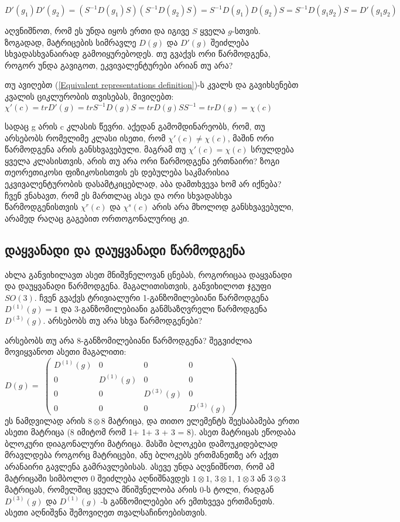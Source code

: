 \documentclass[12pt]{article}
\begin{document}
\begin{sloppypar}
$
D'(g_1)D'(g_2) = (S^{-1}D(g_1)S)(S^{-1}D(g_2)S) = S^{-1}D(g_1)D(g_2)S = S^{-1}D(g_1g_2)S = D'(g_1g_2)
$

აღვნიშნოთ, რომ ეს უნდა იყოს ერთი და იგივე $S$ ყველა $g$-სთვის. ზოგადად, მატრიცების სიმრავლე $D(g)$ და $D'(g)$ შეიძლება სხვადასხვანაირად გამოიყურებოდეს. თუ გვაქვს ორი წარმოდგენა, როგორ უნდა გავიგოთ, ეკვივალენტურები არიან თუ არა?

თუ ავიღებთ (\ref{Equivalent representations definition})-ს კვალს და გავიხსენებთ კვალის ციკლურობის თვისებას, მივიღებთ:
$
\chi'(c) = tr D'(g) = tr S^{-1}D(g)S = tr D(g)SS^{-1} = tr D(g) = \chi(c)
$

სადაც g არის c კლასის წევრი. აქედან გამომდინარეობს, რომ, თუ არსებობს რომელიმე კლასი ისეთი, რომ $\chi'(c) \neq \chi(c)$, მაშინ ორი წარმოდგენა არის განსხვავებული. მაგრამ თუ $\chi'(c) = \chi(c)$ სრულდება ყველა კლასისთვის, არის თუ არა ორი წარმოდგენა ერთნაირი? ზოგი თეორეთიკოსი ფიზიკოსისთვის ეს დებულება საკმარისია ეკვივალენტურობის დასამტკიცებლად, აბა დამთხვევა ხომ არ იქნება? ჩვენ ვნახავთ, რომ ეს მართლაც ასეა და ორი სხვადასხვა წარმოდგენისთვის 
$\chi^{r}(c)$ და $\chi^{s}(c)$ არის არა მხოლოდ განსხვავებული, არამედ რაღაც გაგებით ორთოგონალურიც კი.


\subsection{დაყვანადი და დაუყვანადი წარმოდგენა}
ახლა განვიხილავთ ასეთ მნიშვნელოვან ცნებას, როგორიცაა დაყვანადი და დაუყვანადი წარმოდგენა. მაგალითისთვის, განვიხილოთ ჯგუფი $SO(3)$. ჩვენ გვაქვს ტრივიალური 1-განზომილებიანი წარმოდგენა $D^{(1)}(g) = 1 $ და 3-განზომილებიანი განმსაზღვრელი წარმოდგენა $D^{(3)}(g)$. არსებობს თუ არა სხვა წარმოდგენები?

არსებობს თუ არა 8-განზომილებიანი წარმოდგენა? შეგვიძლია მოვიყვანოთ ასეთი მაგალითი: \\
$D(g) = $
$
\begin{pmatrix}
D^{(1)}(g) & 0 & 0 & 0\\
0 & D^{(1)}(g) & 0 & 0\\
0 & 0 & D^{(3)}(g) & 0\\
0 & 0 & 0 & D^{(3)}(g)
\end{pmatrix}
$ \\

ეს ნამდვილად არის $8\otimes 8$ მატრიცა, და თითო ელემენტს შეესაბამება ერთი ასეთი მატრიცა (8 იმიტომ რომ 1+ 1+ 3 + 3 = 8). ასეთ მატრიცას ეწოდაბა ბლოკური დიაგონალური მატრიცა. მასში ბლოკები დამოუკიდებლად მრავლდება როგორც მატრიცები, ანუ ბლოკებს ერთმანეთზე არ აქვთ არანაირი გავლენა გამრავლებისას. ასევე უნდა აღვნიშნოთ, რომ ამ მატრიცაში სიმბოლო 0 შეიძლება აღნიშნავდეს $1\otimes 1$, $3\otimes 1$, $1\otimes 3$ ან $3\otimes 3$ მატრიცას, რომელშიც ყველა მნიშვნელობა არის 0-ს ტოლი, რადგან $D^{(3)}(g)$ და $D^{(1)}(g)$ -ს განზომილებები არ ემთხვევა ერთმანეთს. ასეთი აღნიშვნა შემოვიღეთ თვალსაჩინოებისთვის. \\


\end{sloppypar}
\end{document}
